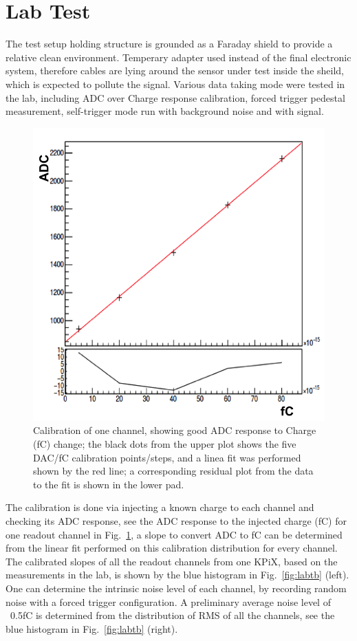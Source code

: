 \documentclass[conference]{IEEEtran}
\begin{document}
\section{Lab Test}
The test setup holding structure is grounded as a Faraday shield to provide a relative clean environment.
Temperary adapter used instead of the final electronic system, therefore cables are lying around the sensor under test inside the sheild, which is expected to pollute the signal.
Various data taking mode were tested in the lab, including ADC over Charge response calibration, forced trigger pedestal measurement, self-trigger mode run with background noise and with signal.
\begin{figure}[!ht]%
  \centering
  \includegraphics[width=0.6\linewidth]{pics/lab_2.png}
  \caption{Calibration of one channel, showing good ADC response to Charge (fC) change;
  the black dots from the upper plot shows the five DAC/fC calibration points/steps, and a linea fit was performed shown by the red line;
  a corresponding residual plot from the data to the fit is shown in the lower pad.}%
\label{fig:lab1}%
\end{figure}

The calibration is done via injecting a known charge to each channel and checking its ADC response,
see the ADC response to the injected charge (fC) for one readout channel in Fig.~\ref{fig:lab1},
a slope to convert ADC to fC can be determined from the linear fit performed on this calibration distribution for every channel.
The calibrated slopes of all the readout channels from one KPiX, based on the measurements in the lab,
is shown by the blue histogram in Fig.~\ref{fig:labtb} (left).
One can determine the intrinsic noise level of each channel, by recording random noise with a forced trigger configuration.
A preliminary average noise level of ~0.5fC is determined from the distribution of RMS of all the channels, see the blue histogram in Fig.~\ref{fig:labtb} (right).
\end{document}
